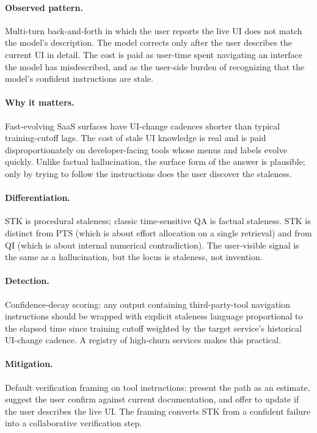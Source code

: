 \documentclass[11pt]{article}
\begin{document}
\paragraph{Observed pattern.} Multi-turn back-and-forth in which the user reports the live UI does not match the model's description. The model corrects only after the user describes the current UI in detail. The cost is paid as user-time spent navigating an interface the model has misdescribed, and as the user-side burden of recognizing that the model's confident instructions are stale.

\paragraph{Why it matters.} Fast-evolving SaaS surfaces have UI-change cadences shorter than typical training-cutoff lags. The cost of stale UI knowledge is real and is paid disproportionately on developer-facing tools whose menus and labels evolve quickly. Unlike factual hallucination, the surface form of the answer is plausible; only by trying to follow the instructions does the user discover the staleness.

\paragraph{Differentiation.} STK is procedural staleness; classic time-sensitive QA is factual staleness. STK is distinct from PTS (which is about effort allocation on a single retrieval) and from QI (which is about internal numerical contradiction). The user-visible signal is the same as a hallucination, but the locus is staleness, not invention.

\paragraph{Detection.} Confidence-decay scoring: any output containing third-party-tool navigation instructions should be wrapped with explicit staleness language proportional to the elapsed time since training cutoff weighted by the target service's historical UI-change cadence. A registry of high-churn services makes this practical.

\paragraph{Mitigation.} Default verification framing on tool instructions: present the path as an estimate, suggest the user confirm against current documentation, and offer to update if the user describes the live UI. The framing converts STK from a confident failure into a collaborative verification step.
\end{document}
